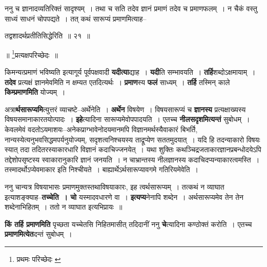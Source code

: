 \documentclass[article,12pt,a4paper]{memoir}
\begin{document}
	  \pstart ननु च ज्ञानादव्यतिरिक्तं सादृश्यम् । तथा च सति तदेव ज्ञानं प्रमाणं तदेव च प्रमाणफलम् । न चैकं वस्तु साध्यं साधनं चोपपद्यते । तत् कथं सारूप्यं प्रमाणमित्याह--
	\pend
        
	  \bigskip
	  \begingroup
	

	  \pstart तद्वशादर्थप्रतीतिसिद्धेरिति ॥ २१ ॥
	\pend
        
	    
	    \pstart
	    \begin{center}
	  ॥ \footnote{प्रथमः परिच्छेदः \cite{dp-msB} \cite{dp-msC}}\-प्रत्यक्षपरिच्छेदः ॥
	    \end{center}
	    \pend
	  
	  
	  \endgroup
	
	  \endgroup
	

	  \pstart किमन्यत्प्रमाणं भविष्यति इत्यागूर्य पूर्वपक्षवादी \textbf{यदीत्या}द्याह । \textbf{यदी}ति सम्भावयति । \textbf{तर्हि}शब्दोऽक्षमायाम् । \textbf{तदेव} प्रत्यक्षं ज्ञानमेवमिति न क्षम्यत एतदित्यर्थः । \textbf{प्रमाण}स्य \textbf{फलं} साध्यम् । \textbf{तर्हि} तस्मिन् काले \textbf{किम्प्रमाणमिति} योज्यम् ।
	\pend
      

	  \pstart अत्रा\textbf{र्थसारूप्यमि}त्युत्तरं व्याचष्टे--अ\leavevmode{}र्थेनेति । \textbf{अर्थेन} विषयेण । विषयसारूप्यं च \textbf{ज्ञानस्य} प्रत्यक्षाख्यस्य विषयसमानाकारतयोत्पादः । \textbf{इहे}त्यादिना सारूप्यमेवोपपादयति । एतच्च \textbf{नीलसदृशमित्यन्तं} सुबोधम् । केवलमेवं वदतोऽयमाशयः--अनेकप्राग्भावेनोदयमानमपि विज्ञानमर्थस्यैवाकारं बिभर्ति, नान्यस्येत्यनुभवसिद्धमपर्यनुयोज्यम्, सदृशत्वनिश्चयस्य ताद्रूप्येण सततमुदयात् । यदि हि तदन्याकारो विषयः स्यात् तदा तदितरस्याकारधारि विज्ञानं कदाचिज्जनयेत् । यथा शुक्तिः कथञ्चिद्रजताकारज्ञानप्रबन्धोदयेऽपि तद्देशोपसृष्टस्य स्वाकारानुकारि ज्ञानं जनयति । न चाभ्रान्तस्य नीलज्ञानस्य कदाचिदप्यन्याकारत्वमस्ति । तस्मादर्थोऽप्येवमाकार इति निश्चीयते । बाह्यार्थेऽर्थसारूप्यावगमे गतिरियमेवेति ।
	\pend
      

	  \pstart ननु चान्यत्र विषयाभासः प्रमाणमुक्तस्तथाविषयाकारः, इह त्वर्थसारूप्यम् । तत्कथं न व्याघात इत्याशङ्क्याह--\textbf{तच्चेति । चो} यस्मादवधारणे वा । \textbf{इत्यप्य}नेनापि शब्देन । अर्थसारूप्यमेव तेन तेन शब्देनाभिहितम् । ततो न व्याघात इत्यभिप्रायः ॥
	\pend
      

	  \pstart \textbf{किं तर्हि प्रमाणमिति} पृच्छता यच्चेतसि निहितमासीत् तदिदानीं ननु \textbf{चे}त्यादिना कण्ठोक्तं करोति । एतच्च \textbf{प्रमाणमित्येत}दन्तं सुबोधम् ।
	\pend
	  \bigskip
	  \begingroup
	
\end{document}
